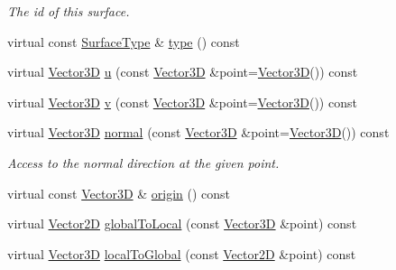 \begin{DoxyCompactItemize}
\begin{DoxyCompactList}\small\item\em The id of this surface. \item\end{DoxyCompactList}\item 
virtual const \hyperlink{class_d_d_surfaces_1_1_surface_type}{SurfaceType} \& \hyperlink{class_d_d4hep_1_1_d_d_rec_1_1_vol_surface_base_a32c932ec7f8a44321c9ea07ac56ab259}{type} () const 
\item 
virtual \hyperlink{class_d_d_surfaces_1_1_vector3_d}{Vector3D} \hyperlink{class_d_d4hep_1_1_d_d_rec_1_1_vol_surface_base_a6b72381e54cf0c94ab56db4bdbc8b4a4}{u} (const \hyperlink{class_d_d_surfaces_1_1_vector3_d}{Vector3D} \&point=\hyperlink{class_d_d_surfaces_1_1_vector3_d}{Vector3D}()) const 
\item 
virtual \hyperlink{class_d_d_surfaces_1_1_vector3_d}{Vector3D} \hyperlink{class_d_d4hep_1_1_d_d_rec_1_1_vol_surface_base_a0dd53eec9381d83d0632329223d0b24b}{v} (const \hyperlink{class_d_d_surfaces_1_1_vector3_d}{Vector3D} \&point=\hyperlink{class_d_d_surfaces_1_1_vector3_d}{Vector3D}()) const 
\item 
virtual \hyperlink{class_d_d_surfaces_1_1_vector3_d}{Vector3D} \hyperlink{class_d_d4hep_1_1_d_d_rec_1_1_vol_surface_base_a0689bccd5a024798609f3ce1b39c7d61}{normal} (const \hyperlink{class_d_d_surfaces_1_1_vector3_d}{Vector3D} \&point=\hyperlink{class_d_d_surfaces_1_1_vector3_d}{Vector3D}()) const 
\begin{DoxyCompactList}\small\item\em Access to the normal direction at the given point. \item\end{DoxyCompactList}\item 
virtual const \hyperlink{class_d_d_surfaces_1_1_vector3_d}{Vector3D} \& \hyperlink{class_d_d4hep_1_1_d_d_rec_1_1_vol_surface_base_a8c0138c1595c6acbc94d5d7af57d468a}{origin} () const 
\item 
virtual \hyperlink{class_d_d_surfaces_1_1_vector2_d}{Vector2D} \hyperlink{class_d_d4hep_1_1_d_d_rec_1_1_vol_surface_base_aa5a6ee5edfdab58a13282beaef1331d4}{globalToLocal} (const \hyperlink{class_d_d_surfaces_1_1_vector3_d}{Vector3D} \&point) const 
\item 
virtual \hyperlink{class_d_d_surfaces_1_1_vector3_d}{Vector3D} \hyperlink{class_d_d4hep_1_1_d_d_rec_1_1_vol_surface_base_a62f5625f6f620535765193e97990fb1d}{localToGlobal} (const \hyperlink{class_d_d_surfaces_1_1_vector2_d}{Vector2D} \&point) const 

\end{DoxyCompactItemize}
